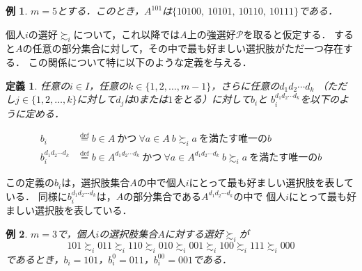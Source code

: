 \documentclass[dvipdfmx]{jsarticle}
\newtheorem{definition}{定義}
\newtheorem{example}{例}
\begin{document}
\begin{example}
  $m=5$とする．このとき，$A^{101}$は$\{10100,\ 10101,\ 10110,\ 10111\}$である．
\end{example}

個人$i$の選好$\succsim_i$について，これ以降では$A$上の強選好$\mathcal{P}$を取ると仮定する．
すると$A$の任意の部分集合に対して，その中で最も好ましい選択肢がただ一つ存在する．
この関係について特に以下のような定義を与える．

\begin{definition}\label{def:最上位選択肢}
  任意の$i \in I$，任意の$k \in \{1,2,\ldots,m-1\}$，さらに任意の$d_{1}d_{2}\cdots d_{k}$
  （ただし$j \in \{1,2,\ldots,k \}$に対して$d_j$は$0$または$1$をとる）に対して$b_{i}$と
  $b_{i}^{d_{1}d_{2}\cdots d_{k}}$を以下のように定める．

  \begin{align*}
    b_i &\stackrel{\mathrm{def}}{=} b \in A\ \text{かつ}\ \forall a \in A \ b \succsim_i a\
    \text{を満たす唯一の}b \\
    b_{i}^{d_{1}d_{2}\cdots d_{k}} &\stackrel{\mathrm{def}}{=}
    b \in A^{d_{1}d_{2}\cdots d_{k}} \ \text{かつ}\ \forall a \in A^{d_{1}d_{2}\cdots d_{k}}
    \ b \succsim_i a\ \text{を満たす唯一の}b
  \end{align*}
\end{definition}

\noindent{}この定義の$b_i$は，選択肢集合$A$の中で個人$i$にとって最も好ましい選択肢を表している．
同様に$b_{i}^{d_{1}d_{2}\cdots d_{k}}$は，$A$の部分集合である$A^{d_{1}d_{2}\cdots d_{k}}$の中で
個人$i$にとって最も好ましい選択肢を表している．

\begin{example}
  $m=3$で，個人$i$の選択肢集合$A$に対する選好$\succsim_i$が
  \[
    101 \succsim_i 011 \succsim_i 110 \succsim_i 010 \succsim_i 001 \succsim_i 100
    \succsim_i 111 \succsim_i 000
  \]
  であるとき，$b_i = 101$，$b_{i}^{0} = 011$，$b_{i}^{00} = 001$である．
\end{example}
\end{document}
